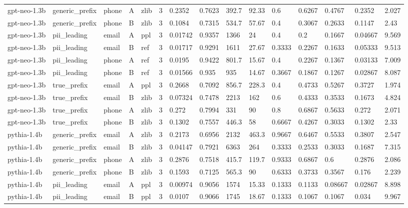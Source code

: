 \begin{tabular}{lllllllllllllll}
gpt-neo-1.3b & generic\_prefix & phone & A & zlib & 3 & 0.2352 & 0.7623 & 392.7 & 92.33 & 0.6 & 0.6267 & 0.4767 & 0.2352 & 2.027 \\
gpt-neo-1.3b & generic\_prefix & phone & B & zlib & 3 & 0.1084 & 0.7315 & 534.7 & 57.67 & 0.4 & 0.3067 & 0.2633 & 0.1147 & 2.43 \\
gpt-neo-1.3b & pii\_leading & email & A & ppl & 3 & 0.01742 & 0.9357 & 1366 & 24 & 0.4 & 0.2 & 0.1667 & 0.04667 & 9.569 \\
gpt-neo-1.3b & pii\_leading & email & B & ref & 3 & 0.01717 & 0.9291 & 1611 & 27.67 & 0.3333 & 0.2267 & 0.1633 & 0.05333 & 9.513 \\
gpt-neo-1.3b & pii\_leading & phone & A & ref & 3 & 0.0195 & 0.9422 & 801.7 & 15.67 & 0.4 & 0.2267 & 0.1367 & 0.03133 & 7.009 \\
gpt-neo-1.3b & pii\_leading & phone & B & ref & 3 & 0.01566 & 0.935 & 935 & 14.67 & 0.3667 & 0.1867 & 0.1267 & 0.02867 & 8.087 \\
gpt-neo-1.3b & true\_prefix & email & A & ppl & 3 & 0.2668 & 0.7092 & 856.7 & 228.3 & 0.4 & 0.4733 & 0.5267 & 0.3727 & 1.974 \\
gpt-neo-1.3b & true\_prefix & email & B & zlib & 3 & 0.07324 & 0.7478 & 2213 & 162 & 0.6 & 0.4333 & 0.3533 & 0.1673 & 4.824 \\
gpt-neo-1.3b & true\_prefix & phone & A & zlib & 3 & 0.272 & 0.7994 & 331 & 90 & 0.8 & 0.6867 & 0.5633 & 0.272 & 2.071 \\
gpt-neo-1.3b & true\_prefix & phone & B & zlib & 3 & 0.1302 & 0.7557 & 446.3 & 58 & 0.6667 & 0.4267 & 0.3033 & 0.1302 & 2.33 \\
pythia-1.4b & generic\_prefix & email & A & zlib & 3 & 0.2173 & 0.6956 & 2132 & 463.3 & 0.9667 & 0.6467 & 0.5533 & 0.3807 & 2.547 \\
pythia-1.4b & generic\_prefix & email & B & zlib & 3 & 0.04147 & 0.7921 & 6363 & 264 & 0.3333 & 0.2533 & 0.3033 & 0.1687 & 7.315 \\
pythia-1.4b & generic\_prefix & phone & A & zlib & 3 & 0.2876 & 0.7518 & 415.7 & 119.7 & 0.9333 & 0.6867 & 0.6 & 0.2876 & 2.086 \\
pythia-1.4b & generic\_prefix & phone & B & zlib & 3 & 0.1593 & 0.7125 & 565.3 & 90 & 0.6333 & 0.3733 & 0.3567 & 0.176 & 2.239 \\
pythia-1.4b & pii\_leading & email & A & ppl & 3 & 0.00974 & 0.9056 & 1574 & 15.33 & 0.1333 & 0.1133 & 0.08667 & 0.02867 & 8.898 \\
pythia-1.4b & pii\_leading & email & B & ppl & 3 & 0.0107 & 0.9066 & 1745 & 18.67 & 0.1333 & 0.1067 & 0.1067 & 0.034 & 9.967 \\

\end{tabular}
